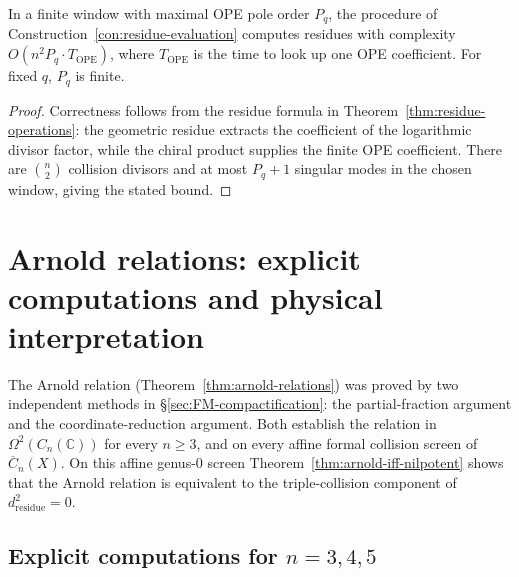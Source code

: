\begin{proposition}
\label{prop:residue-evaluation-complexity}
In a finite window with maximal OPE pole order $P_q$, the procedure of
Construction~\ref{con:residue-evaluation} computes residues with
complexity $O(n^2 P_q\cdot T_{\mathrm{OPE}})$, where
$T_{\mathrm{OPE}}$ is the time to look up one OPE coefficient. For
fixed $q$, $P_q$ is finite.
\end{proposition}

\begin{proof}
Correctness follows from the residue formula in
Theorem~\ref{thm:residue-operations}: the geometric residue extracts
the coefficient of the logarithmic divisor factor, while the chiral
product supplies the finite OPE coefficient. There are $\binom{n}{2}$
collision divisors and at most $P_q+1$ singular modes in the chosen
window, giving the stated bound.
\end{proof}

\section{Arnold relations: explicit computations and physical interpretation}
\label{sec:arnold-three-proofs-comprehensive}
\label{sec:arnold-chiral}

The Arnold relation (Theorem~\ref{thm:arnold-relations}) was proved
by two independent methods in \S\ref{sec:FM-compactification}: the
partial-fraction argument and the coordinate-reduction argument. Both
establish the relation in
$\Omega^2(C_n(\mathbb{C}))$ for every $n \geq 3$, and on every affine
formal collision screen of $\overline{C}_n(X)$. On this affine
genus-$0$ screen Theorem~\ref{thm:arnold-iff-nilpotent} shows that the
Arnold relation is equivalent to the triple-collision component of
$d_{\mathrm{residue}}^2 = 0$.

\label{prop:arnold-topological}%
\label{sec:arnold-proof-topological}%
\label{prop:nilpotency-arnold-comprehensive}%

\subsection{\texorpdfstring{Explicit computations for $n = 3, 4, 5$}{Explicit computations for n = 3, 4, 5}}
\label{sec:arnold-explicit-n2345}

